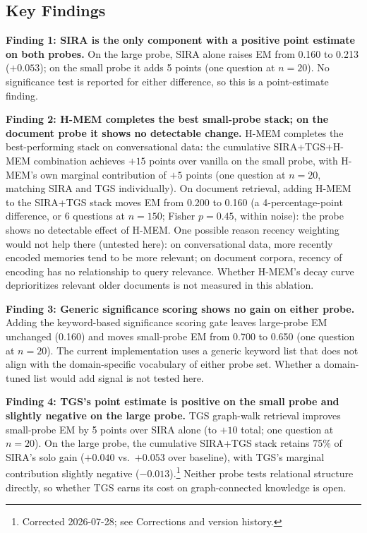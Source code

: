 \documentclass[11pt,a4paper]{article}
\begin{document}
\subsection{Key Findings}

\textbf{Finding 1: SIRA is the only component with a positive point estimate on both probes.}
On the large probe, SIRA alone raises EM from 0.160 to 0.213 ($+0.053$); on the small probe it adds 5 points (one question at $n=20$). No significance test is reported for either difference, so this is a point-estimate finding.

\textbf{Finding 2: H-MEM completes the best small-probe stack; on the document probe it shows no detectable change.}
H-MEM completes the best-performing stack on conversational data: the cumulative SIRA+TGS+H-MEM combination achieves $+15$ points over vanilla on the small probe, with H-MEM's own marginal contribution of $+5$ points (one question at $n=20$, matching SIRA and TGS individually). On document retrieval, adding H-MEM to the SIRA+TGS stack moves EM from 0.200 to 0.160 (a 4-percentage-point difference, or 6 questions at $n=150$; Fisher $p=0.45$, within noise): the probe shows no detectable effect of H-MEM. One possible reason recency weighting would not help there (untested here): on conversational data, more recently encoded memories tend to be more relevant; on document corpora, recency of encoding has no relationship to query relevance. Whether H-MEM's decay curve deprioritizes relevant older documents is not measured in this ablation.

\textbf{Finding 3: Generic significance scoring shows no gain on either probe.}
Adding the keyword-based significance scoring gate leaves large-probe EM unchanged (0.160) and moves small-probe EM from 0.700 to 0.650 (one question at $n=20$). The current implementation uses a generic keyword list that does not align with the domain-specific vocabulary of either probe set. Whether a domain-tuned list would add signal is not tested here.

\textbf{Finding 4: TGS's point estimate is positive on the small probe and slightly negative on the large probe.}
TGS graph-walk retrieval improves small-probe EM by 5 points over SIRA alone (to $+10$ total; one question at $n=20$). On the large probe, the cumulative SIRA+TGS stack retains 75\% of SIRA's solo gain ($+0.040$ vs.\ $+0.053$ over baseline), with TGS's marginal contribution slightly negative ($-0.013$).\footnote{Corrected 2026-07-28; see Corrections and version history.} Neither probe tests relational structure directly, so whether TGS earns its cost on graph-connected knowledge is open.
\end{document}
